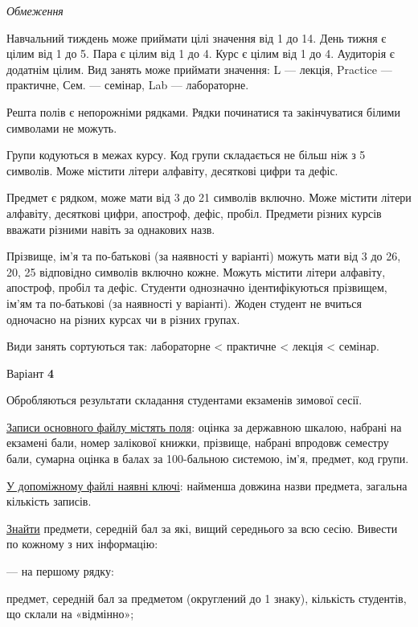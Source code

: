 \documentclass[11pt, ukrainian]{article}
\begin{document}

\bigskip\textit{Обмеження}

Навчальний тиждень може приймати цілі значення від 1 до 14.
День тижня є цілим від 1 до 5. Пара є цілим від 1 до 4.
Курс є цілим від 1 до 4. Аудиторія є додатнім цілим.
Вид занять може приймати значення:
L --- лекція, Practice --- практичне, Сем. --- семінар, Lab --- лабораторне.

Решта полів є непорожніми рядками.
Рядки починатися та закінчуватися білими символами не можуть.

Групи кодуються в межах курсу.
Код групи складається не більш ніж з 5 символів.
Може містити літери алфавіту, десяткові цифри та дефіс.

Предмет є рядком, може мати від 3 до 21 символів включно.
Може містити літери алфавіту, десяткові цифри, апостроф, дефіс, пробіл.
Предмети різних курсів вважати різними навіть за однакових назв.

Прізвище, ім’я та по-батькові (за наявності у варіанті)
можуть мати від 3 до 26, 20, 25 відповідно символів включно кожне.
Можуть містити літери алфавіту, апостроф, пробіл та дефіс.
Студенти однозначно ідентифікуються прізвищем, ім’ям та по-батькові (за наявності у варіанті).
Жоден студент не вчиться одночасно на різних курсах чи в різних групах.

Види занять сортуються так: лабораторне < практичне < лекція < семінар.





\par
\newpage
{\center Варіант  \No \textbf { 4 }\par}
\bigskip
Обробляються результати складання студентами екзаменів зимової сесії.

\underline{Записи основного файлу містять поля}: оцінка за державною шкалою, набрані на екзамені бали, номер залікової книжки, прізвище, набрані впродовж семестру бали, сумарна оцінка в балах за 100-бальною системою, ім’я, предмет, код групи.

\underline{У допоміжному файлі наявні ключі}: найменша довжина назви предмета, загальна кількість записів.

\underline{Знайти} предмети, середній бал за які, вищий середнього за всю сесію. Вивести по кожному з них інформацію:\par
{\noindent}--- на першому рядку:\par
предмет, середній бал за предметом (округлений до 1 знаку), кількість студентів, що склали на «відмінно»;
\end{document}
